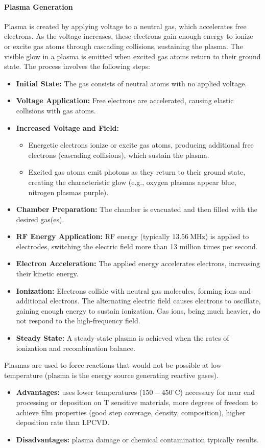 \documentclass{report}
\begin{document}
\paragraph{Plasma Generation} Plasma is created by applying voltage to a neutral gas, which accelerates free electrons. As the voltage increases, these electrons gain enough energy to ionize or excite gas atoms through cascading collisions, sustaining the plasma. The visible glow in a plasma is emitted when excited gas atoms return to their ground state. The process involves the following steps:

\begin{itemize}
    \item \textbf{Initial State:} The gas consists of neutral atoms with no applied voltage.
    \item \textbf{Voltage Application:} Free electrons are accelerated, causing elastic collisions with gas atoms.
    \item \textbf{Increased Voltage and Field:}
    \begin{itemize}
        \item Energetic electrons ionize or excite gas atoms, producing additional free electrons (cascading collisions), which sustain the plasma.
        \item Excited gas atoms emit photons as they return to their ground state, creating the characteristic glow (e.g., oxygen plasmas appear blue, nitrogen plasmas purple).
    \end{itemize}
    \item \textbf{Chamber Preparation:} The chamber is evacuated and then filled with the desired gas(es).
    \item \textbf{RF Energy Application:} RF energy (typically $13.56\ \text{MHz}$) is applied to electrodes, switching the electric field more than 13 million times per second.
    \item \textbf{Electron Acceleration:} The applied energy accelerates electrons, increasing their kinetic energy.
    \item \textbf{Ionization:} Electrons collide with neutral gas molecules, forming ions and additional electrons. The alternating electric field causes electrons to oscillate, gaining enough energy to sustain ionization. Gas ions, being much heavier, do not respond to the high-frequency field.
    \item \textbf{Steady State:} A steady-state plasma is achieved when the rates of ionization and recombination balance.
\end{itemize}
Plasmas are used to force reactions that would not be possible at low temperature (plasma is the energy source generating reactive gases).
    \begin{itemize}
        \item\textbf{Advantages:} uses lower temperatures ($150 - 450^\circ\text{C}$) necessary for near end processing or deposition on $\text{T}$ sensitive materials, more degrees of freedom to achieve film properties (good step coverage, density, composition), higher deposition rate than $\text{LPCVD}$.
        \item \textbf{Disadvantages:} plasma damage or chemical contamination typically results.
\end{itemize}
\end{document}
